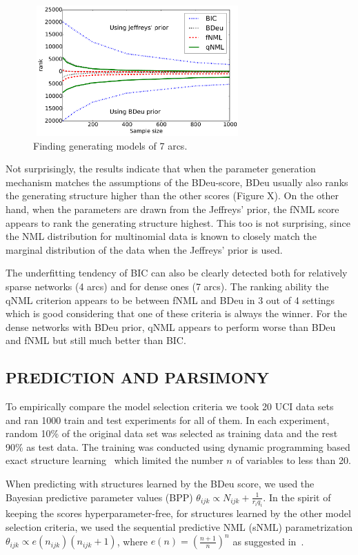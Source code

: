 \begin{figure}[h]
\centering
\includegraphics[width=8cm,height=5cm]{qNML_images/art7_mean.pdf}
\caption{Finding generating models of 7 arcs.}
\label{fig:4arcs}
\end{figure}


Not surprisingly, the results indicate that when the parameter generation
mechanism matches the assumptions of the BDeu-score, BDeu usually
also ranks the generating structure higher than the other scores
(Figure X).  On the other hand, when the parameters are drawn from the
Jeffreys' prior, the fNML score appears to rank the generating structure
highest. This too is not surprising, since the NML distribution for
multinomial data is known to closely match the marginal distribution of
the data when the Jeffreys' prior is used.

The underfitting tendency of BIC can also be clearly detected both for
relatively sparse networks (4 arcs) and for dense ones (7 arcs). The
ranking ability the qNML criterion appears to be between fNML and BDeu
in 3 out of 4 settings which is good considering that one of these
criteria is always the winner. For the dense networks with BDeu prior,
qNML appears to perform worse than BDeu and fNML but still much
better than BIC.

\subsection{PREDICTION AND PARSIMONY}

To empirically compare the model selection criteria we took 20 UCI
data sets~\cite{Lichman:2013} and ran 1000 train and test experiments
for all of them. In each experiment, random 10\% of the original
data set was selected as training data and the rest 90\% as test data.
The training was conducted using dynamic programming based exact structure
learning~\cite{cosco.uai06} which limited the number $n$ of variables
to less than 20.

When predicting with structures learned by the BDeu score, we used the
Bayesian predictive parameter values (BPP) $\theta_{ijk} \propto
N_{ijk}+\frac{1}{r_iq_i}$.  In the spirit of keeping the scores
hyperparameter-free, for structures learned by the other model
selection criteria, we used the sequential predictive NML (sNML)
parametrization $\theta_{ijk}\propto e(n_{ijk})(n_{ijk}+1)$, where
$e(n)=(\frac{n+1}{n})^n$ as suggested in~\cite{Riss07b}.

